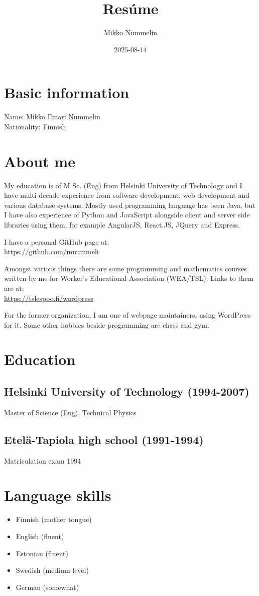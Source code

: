 \documentclass[a4paper,12pt]{article}
\title{Resúme}
\author{Mikko Nummelin}
\date{2025-08-14}
\begin{document}
\maketitle
\section*{Basic information}
Name: Mikko Ilmari Nummelin \\
Nationality: Finnish
\section*{About me}
My education is of M Sc. (Eng) from Helsinki University of Technology and I have multi-decade experience from software development, web development and various database systems. Mostly used programming language has been Java, but I have also experience of Python and JavaScript alongside client and server side libraries using them, for example AngularJS, React.JS, JQuery and Express.

I have a personal GitHub page at:\\
\href{https://github.com/mnummeli}{https://github.com/mnummeli}

Amongst various things there are some programming and mathematics courses written by me for Worker's Educational Association (WEA/TSL). Links to them are at:\\
\href{https://tslespoo.fi/wordpress}{https://tslespoo.fi/wordpress}

For the former organization, I am one of webpage maintainers, using WordPress for it. Some other hobbies beside programming are chess and gym.
\section*{Education}
\subsection*{Helsinki University of Technology (1994-2007)}
Master of Science (Eng), Technical Physics
\subsection*{Etelä-Tapiola high school (1991-1994)}
Matriculation exam 1994
\section*{Language skills}
\begin{itemize}
\item{Finnish (mother tongue)}
\item{English (fluent)}
\item{Estonian (fluent)}
\item{Swedish (medium level)}
\item{German (somewhat)}
\end{itemize}
\end{document}
